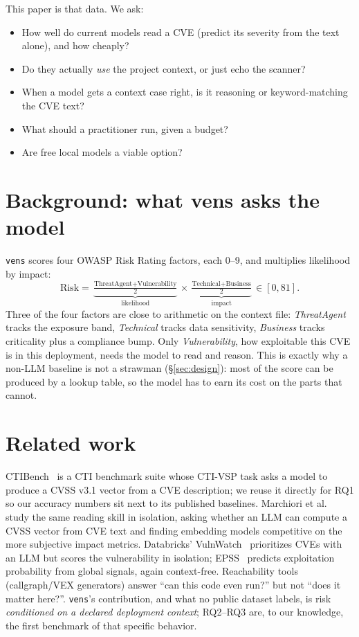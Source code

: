 \documentclass[10pt,twocolumn]{article}
\newcommand{\code}[1]{\texttt{\small #1}}
\begin{document}
This paper is that data. We ask:
\begin{itemize}\itemsep0.1ex
\item[\textbf{RQ1}] How well do current models read a CVE (predict its severity
  from the text alone), and how cheaply?
\item[\textbf{RQ2}] Do they actually \emph{use} the project context, or just
  echo the scanner?
\item[\textbf{RQ3}] When a model gets a context case right, is it reasoning or
  keyword-matching the CVE text?
\item[\textbf{RQ4}] What should a practitioner run, given a budget?
\item[\textbf{RQ5}] Are free local models a viable option?
\end{itemize}

\section{Background: what vens asks the model}
\label{sec:bg}
\code{vens} scores four OWASP Risk Rating factors, each 0--9, and multiplies
likelihood by impact:
\[
\text{Risk} = \underbrace{\tfrac{\text{ThreatAgent}+\text{Vulnerability}}{2}}_{\text{likelihood}}
\times
\underbrace{\tfrac{\text{Technical}+\text{Business}}{2}}_{\text{impact}} \in [0,81].
\]
Three of the four factors are close to arithmetic on the context file:
\emph{ThreatAgent} tracks the exposure band, \emph{Technical} tracks
data sensitivity, \emph{Business} tracks criticality plus a compliance bump. Only
\emph{Vulnerability}, how exploitable this CVE is in this deployment, needs the
model to read and reason. This is exactly why a non-LLM baseline is not a
strawman (\S\ref{sec:design}): most of the score can be produced by a lookup
table, so the model has to earn its cost on the parts that cannot.

\section{Related work}
CTIBench~\cite{ctibench} is a CTI benchmark suite whose CTI-VSP task asks a model
to produce a CVSS v3.1 vector from a CVE description; we reuse it directly for
RQ1 so our accuracy numbers sit next to its published baselines. Marchiori et
al.~\cite{marchiori} study the same reading skill in isolation, asking whether an
LLM can compute a CVSS vector from CVE text and finding embedding models
competitive on the more subjective impact metrics. Databricks'
VulnWatch~\cite{vulnwatch} prioritizes CVEs with an LLM but scores the
vulnerability in isolation; EPSS~\cite{epss} predicts exploitation probability
from global signals, again context-free. Reachability tools
(callgraph/VEX generators) answer ``can this code even run?'' but not ``does it
matter here?''. \code{vens}'s contribution, and what no public dataset labels, is
risk \emph{conditioned on a declared deployment context}; RQ2--RQ3 are, to our
knowledge, the first benchmark of that specific behavior.
\end{document}

